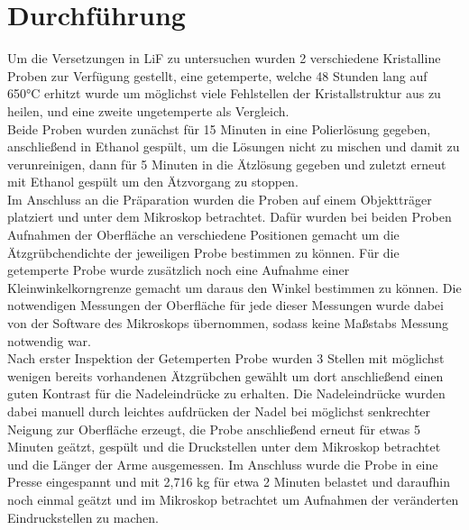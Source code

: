 ﻿\section{Durchführung}
	Um die Versetzungen in LiF zu untersuchen wurden 2 verschiedene Kristalline Proben zur Verfügung gestellt, eine getemperte, welche 48 Stunden lang auf 650°C erhitzt wurde um möglichst viele Fehlstellen der Kristallstruktur
	aus zu heilen, und eine zweite ungetemperte als Vergleich.\\
	Beide Proben wurden zunächst für 15 Minuten in eine Polierlösung gegeben, anschließend in Ethanol gespült, um die Lösungen nicht zu mischen und damit zu verunreinigen, 
	dann für 5 Minuten in die Ätzlösung gegeben und zuletzt erneut mit Ethanol gespült um den Ätzvorgang zu stoppen.\\
	Im Anschluss an die Präparation wurden die Proben auf einem Objektträger platziert und unter dem Mikroskop betrachtet. Dafür wurden bei beiden Proben 
	Aufnahmen der Oberfläche an verschiedene Positionen gemacht um die Ätzgrübchendichte der jeweiligen Probe bestimmen zu können. Für die getemperte Probe wurde 
	zusätzlich noch eine Aufnahme einer Kleinwinkelkorngrenze gemacht um daraus den Winkel bestimmen zu können. Die notwendigen Messungen der Oberfläche für jede dieser
	Messungen wurde dabei von der Software des Mikroskops übernommen, sodass keine Maßstabs Messung notwendig war.\\
	Nach erster Inspektion der Getemperten Probe wurden 3 Stellen mit möglichst wenigen bereits vorhandenen Ätzgrübchen gewählt um dort anschließend einen guten Kontrast für die Nadeleindrücke zu erhalten.
	Die Nadeleindrücke wurden dabei manuell durch leichtes aufdrücken der Nadel bei möglichst senkrechter Neigung zur Oberfläche erzeugt, die Probe anschließend erneut für etwas 5 Minuten geätzt, gespült und die Druckstellen unter
	dem Mikroskop betrachtet und die Länger der Arme ausgemessen.
	Im Anschluss wurde die Probe in eine Presse eingespannt und mit 2,716 kg für etwa 2 Minuten belastet und daraufhin noch einmal geätzt und im Mikroskop betrachtet um Aufnahmen der veränderten Eindruckstellen zu machen. 